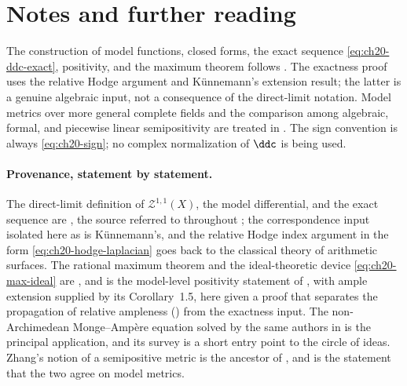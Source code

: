 \section*{Notes and further reading}

The construction of model functions, closed forms, the exact sequence
\eqref{eq:ch20-ddc-exact}, positivity, and the maximum theorem follows
\cite[Sections~2, 4, and~5]{BFJ16}.  The exactness proof uses the relative
Hodge argument and K\"unnemann's extension result; the latter is a genuine
algebraic input, not a consequence of the direct-limit notation.  Model
metrics over more general complete fields and the comparison among
algebraic, formal, and piecewise linear semipositivity are treated in
\cite{GM19}.  The sign convention is always
\eqref{eq:ch20-sign}; no complex normalization of $\ddc$ is being used.

\paragraph{Provenance, statement by statement.}
The direct-limit definition of $\mathcal Z^{1,1}(X)$, the model
differential, and the exact sequence are \cite[\S\S2 and 4]{BFJ16}, the
source referred to throughout ; the correspondence input
isolated here as  is K\"unnemann's, and the
relative Hodge index argument in the form
\eqref{eq:ch20-hodge-laplacian} goes back to the classical theory of
arithmetic surfaces.  The rational maximum theorem
 and the ideal-theoretic device
\eqref{eq:ch20-max-ideal} are \cite[\S5]{BFJ16}, and
 is the model-level positivity
statement of \cite[Proposition~5.2]{BFJ16}, with ample extension supplied
by its Corollary~1.5, here given a proof that separates the
propagation of relative ampleness () from
the exactness input.  The non-Archimedean
Monge--Amp\`ere equation solved by the same authors in \cite{BFJ15} is the
principal application, and its survey \cite{BFJ16b} is a short entry point
to the circle of ideas.  Zhang's notion of a semipositive metric
\cite{Zhang1995} is the ancestor of , and
 is the statement that the two agree on
model metrics.


